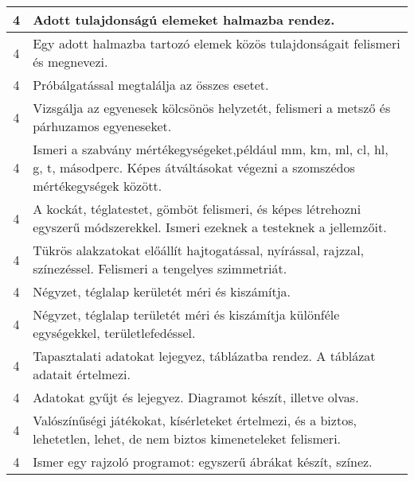 \begin{longtable}{c | p{} }
                                
                                          4 &  Adott tulajdonságú elemeket halmazba rendez. \\ \hline
                                          4 &  Egy adott halmazba tartozó elemek közös tulajdonságait felismeri és megnevezi. \\ \hline
                                          4 &  Próbálgatással megtalálja az összes esetet. \\ \hline
                                          4 &  Vizsgálja az egyenesek kölcsönös helyzetét, felismeri a metsző és párhuzamos egyeneseket. \\ \hline
                                          4 &  Ismeri a szabvány mértékegységeket,például mm, km, ml, cl, hl, g, t, másodperc. Képes átváltásokat végezni a szomszédos mértékegységek között. \\ \hline
                                          4 &  A kockát, téglatestet, gömböt felismeri, és képes létrehozni egyszerű módszerekkel. Ismeri ezeknek a testeknek a jellemzőit. \\ \hline
                                          4 &  Tükrös alakzatokat  előállít hajtogatással, nyírással, rajzzal, színezéssel. Felismeri a tengelyes szimmetriát. \\ \hline
                                          4 &  Négyzet, téglalap kerületét méri és kiszámítja. \\ \hline
                                          4 &  Négyzet, téglalap területét méri és kiszámítja különféle egységekkel, területlefedéssel. \\ \hline
                                          4 &  Tapasztalati adatokat lejegyez, táblázatba rendez. A táblázat adatait értelmezi. \\ \hline
                                          4 &  Adatokat gyűjt és lejegyez. Diagramot készít, illetve olvas. \\ \hline
                                          4 &  Valószínűségi játékokat, kísérleteket értelmezi, és a biztos, lehetetlen, lehet, de nem biztos kimeneteleket felismeri. \\ \hline
                                          4 &  Ismer egy rajzoló programot: egyszerű ábrákat készít, színez.
 \\ \hline
                                      
                        \end{longtable}
            \clearpage

